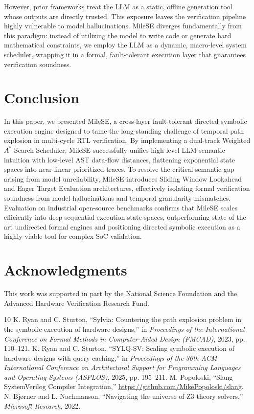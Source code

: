 \documentclass[conference]{IEEEtran}
\begin{document}
However, prior frameworks treat the LLM as a static, offline generation tool whose outputs are directly trusted. This exposure leaves the verification pipeline highly vulnerable to model hallucinations. MileSE diverges fundamentally from this paradigm: instead of utilizing the model to write code or generate hard mathematical constraints, we employ the LLM as a dynamic, macro-level system scheduler, wrapping it in a formal, fault-tolerant execution layer that guarantees verification soundness.

\section{Conclusion}
\label{sec:conclusion}
In this paper, we presented MileSE, a cross-layer fault-tolerant directed symbolic execution engine designed to tame the long-standing challenge of temporal path explosion in multi-cycle RTL verification. By implementing a dual-track Weighted $A^*$ Search Scheduler, MileSE successfully unifies high-level LLM semantic intuition with low-level AST data-flow distances, flattening exponential state spaces into near-linear prioritized traces. To resolve the critical semantic gap arising from model unreliability, MileSE introduces Sliding Window Lookahead and Eager Target Evaluation architectures, effectively isolating formal verification soundness from model hallucinations and temporal granularity mismatches. Evaluation on industrial open-source benchmarks confirms that MileSE scales efficiently into deep sequential execution state spaces, outperforming state-of-the-art undirected formal engines and positioning directed symbolic execution as a highly viable tool for complex SoC validation.

\section*{Acknowledgments}
This work was supported in part by the National Science Foundation and the Advanced Hardware Verification Research Fund.

\begin{thebibliography}{10}
 K. Ryan and C. Sturton, ``Sylvia: Countering the path explosion problem in the symbolic execution of hardware designs,'' in \textit{Proceedings of the International Conference on Formal Methods in Computer-Aided Design (FMCAD)}, 2023, pp. 110--121.
 K. Ryan and C. Sturton, ``SYLQ-SV: Scaling symbolic execution of hardware designs with query caching,'' in \textit{Proceedings of the 30th ACM International Conference on Architectural Support for Programming Languages and Operating Systems (ASPLOS)}, 2025, pp. 195--211.
 M. Popoloski, ``Slang SystemVerilog Compiler Integration,'' \url{https://github.com/MikePopoloski/slang}.
 N. Bj{\o}rner and L. Nachmanson, ``Navigating the universe of Z3 theory solvers,'' \textit{Microsoft Research}, 2022.
\end{thebibliography}
\end{document}
